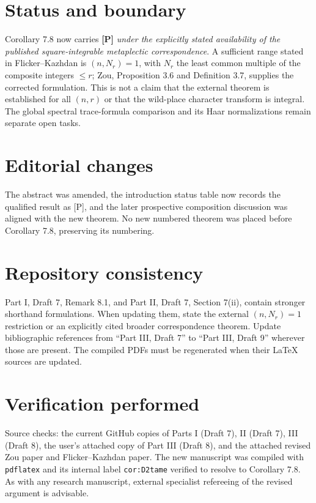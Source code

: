 \documentclass[11pt]{article}
\begin{document}
\section*{Status and boundary}
Corollary 7.8 now carries \textbf{[P]} \emph{under the explicitly stated availability of the published square-integrable metaplectic correspondence}. A sufficient range stated in Flicker--Kazhdan is $(n,N_r)=1$, with $N_r$ the least common multiple of the composite integers $\le r$; Zou, Proposition 3.6 and Definition 3.7, supplies the corrected formulation. This is not a claim that the external theorem is established for all $(n,r)$ or that the wild-place character transform is integral. The global spectral trace-formula comparison and its Haar normalizations remain separate open tasks.
\section*{Editorial changes}
The abstract was amended, the introduction status table now records the qualified result as [P], and the later prospective composition discussion was aligned with the new theorem. No new numbered theorem was placed before Corollary 7.8, preserving its numbering.
\section*{Repository consistency}
Part I, Draft 7, Remark 8.1, and Part II, Draft 7, Section 7(ii), contain stronger shorthand formulations. When updating them, state the external $(n,N_r)=1$ restriction or an explicitly cited broader correspondence theorem. Update bibliographic references from ``Part III, Draft 7'' to ``Part III, Draft 9'' wherever those are present. The compiled PDFs must be regenerated when their LaTeX sources are updated.
\section*{Verification performed}
Source checks: the current GitHub copies of Parts I (Draft 7), II (Draft 7), III (Draft 8), the user's attached copy of Part III (Draft 8), and the attached revised Zou paper and Flicker--Kazhdan paper. The new manuscript was compiled with \texttt{pdflatex} and its internal label \texttt{cor:D2tame} verified to resolve to Corollary 7.8. As with any research manuscript, external specialist refereeing of the revised argument is advisable.
\end{document}
